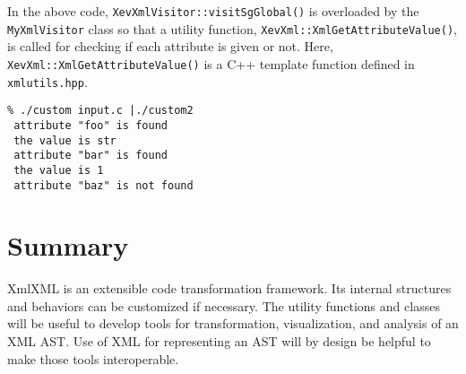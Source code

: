 In the above code, \texttt{XevXmlVisitor::visitSgGlobal()} is overloaded
by the \texttt{MyXmlVisitor} class so that a utility function,
\texttt{XevXml::XmlGetAttributeValue()}, is called for checking if each
attribute is given or not.  Here,
\texttt{XevXml::XmlGetAttributeValue()} is a C++ template function
defined in \texttt{xmlutils.hpp}.

\begin{verbatim}
% ./custom input.c |./custom2
 attribute "foo" is found
 the value is str
 attribute "bar" is found
 the value is 1
 attribute "baz" is not found
\end{verbatim}

\section{Summary}
XmlXML is an extensible code transformation framework. Its internal
structures and behaviors can be customized if necessary. The utility
functions and classes will be useful to develop tools for
transformation, visualization, and analysis of an XML AST. Use of XML
for representing an AST will by design be helpful to make those tools
interoperable.

